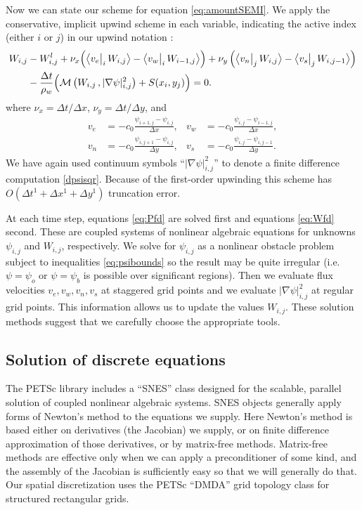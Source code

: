 \documentclass[11pt]{amsart}
\newcommand{\psiij}{\psi_{i,j}}
\newcommand{\Wlij}{W^l_{i,j}}
\newcommand{\Wij}{W_{i,j}}
\begin{document}
Now we can state our scheme for equation \eqref{eq:amountSEMI}.  We apply the conservative, implicit upwind scheme in each variable, indicating the active index (either $i$ or $j$) in our upwind notation :
\newcommand{\upp}[3]{\big<#1\big|_{#3}\,#2\big>}
\begin{align}
 \Wij &- \Wlij + \nu_x \Big(\upp{v_e}{\Wij}{i} - \upp{v_w}{W_{i-1,j}}{i}\Big) + \nu_y \left(\upp{v_n}{\Wij}{j} - \upp{v_s}{W_{i,j-1}}{j}\right)\label{eq:Wfd} \\
      &- \frac{\Delta t}{\rho_w} \Big(\mathcal{M}\left(\Wij \,, |\nabla \psi|_{i,j}^2\right) + S(x_i,y_j)\Big) = 0. \notag
\end{align}
where $\nu_x = \Delta t/\Delta x$, $\nu_y = \Delta t/\Delta y$, and
\begin{align*}
   v_e &= - c_0 \frac{\psi_{i+1,j}-\psiij}{\Delta x}, &  v_w &= - c_0 \frac{\psiij - \psi_{i-1,j}}{\Delta x}, \\
   v_n &= - c_0 \frac{\psi_{i,j+1}-\psiij}{\Delta y}, &  v_s &= - c_0 \frac{\psiij - \psi_{i,j-1}}{\Delta y}.
\end{align*}
We have again used continuum symbols ``$|\nabla \psi|_{i,j}^2$'' to denote a finite difference computation \eqref{dpsisqr}.  Because of the first-order upwinding this scheme has $O(\Delta t^1 + \Delta x^1 + \Delta y^1)$ truncation error.

At each time step, equations \eqref{eq:Pfd} are solved first and equations \eqref{eq:Wfd} second.  These are coupled systems of nonlinear algebraic equations for unknowns $\psiij$ and $\Wij$, respectively.  We solve for $\psiij$ as a nonlinear obstacle problem subject to inequalities \eqref{eq:psibounds} so the result may be quite irregular (i.e.~$\psi=\psi_o$ or $\psi=\psi_b$ is possible over significant regions).  Then we evaluate flux velocities $v_e,v_w,v_n,v_s$ at staggered grid points and we evaluate $|\nabla \psi|_{i,j}^2$ at regular grid points.  This information allows us to update the values $\Wij$.  These solution methods suggest that we carefully choose the appropriate tools.


\subsection*{Solution of discrete equations}  The PETSc \citep{petsc-user-ref} library includes a ``SNES'' class designed for the scalable, parallel solution of coupled nonlinear algebraic systems.  SNES objects generally apply forms of Newton's method to the equations we supply.  Here Newton's method is based either on derivatives (the Jacobian) we supply, or on finite difference approximation of those derivatives, or by matrix-free methods.  Matrix-free methods are effective only when we can apply a preconditioner of some kind, and the assembly of the Jacobian is sufficiently easy so that we will generally do that.  Our spatial discretization uses the PETSc ``DMDA'' grid topology class for structured rectangular grids.
\end{document}
